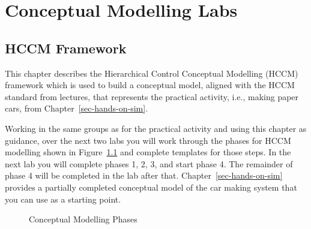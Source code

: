 \documentclass[
  10pt,
  a4paperpaper,
  DIV=11,
  numbers=noendperiod,
  oneside]{scrreprt}
\begin{document}
\part{Conceptual Modelling Labs}

\chapter{HCCM Framework}\label{hccm-framework}

This chapter describes the Hierarchical Control Conceptual Modelling
(HCCM) framework which is used to build a conceptual model, aligned with
the HCCM standard from lectures, that represents the practical activity,
i.e., making paper cars, from Chapter~\ref{sec-hands-on-sim}.

Working in the same groups as for the practical activity and using this
chapter as guidance, over the next two labs you will work through the
phases for HCCM modelling shown in Figure~\ref{fig-cm_phases} and
complete templates for those steps. In the next lab you will complete
phases 1, 2, 3, and start phase 4. The remainder of phase 4 will be
completed in the lab after that. Chapter~\ref{sec-hands-on-sim} provides
a partially completed conceptual model of the car making system that you
can use as a starting point.

\begin{figure}[htbp]


\caption{\label{fig-cm_phases}Conceptual Modelling Phases}

\end{figure}%
\end{document}
